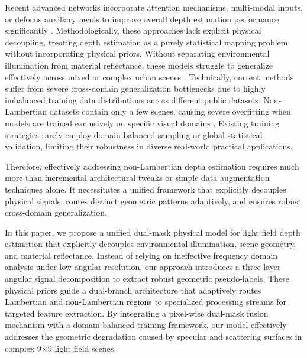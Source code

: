 \documentclass[lettersize,journal]{IEEEtran}
\begin{document}
Recent advanced networks incorporate attention mechanisms, multi-modal inputs, or defocus auxiliary heads to improve overall depth estimation performance significantly \cite{attention_lf, defocus_lf}. Methodologically, these approaches lack explicit physical decoupling, treating depth estimation as a purely statistical mapping problem without incorporating physical priors. Without separating environmental illumination from material reflectance, these models struggle to generalize effectively across mixed or complex urban scenes \cite{mixed_scenes, generalization}. Technically, current methods suffer from severe cross-domain generalization bottlenecks due to highly imbalanced training data distributions across different public datasets. Non-Lambertian datasets contain only a few scenes, causing severe overfitting when models are trained exclusively on specific visual domains \cite{data_imbalance, overfitting}. Existing training strategies rarely employ domain-balanced sampling or global statistical validation, limiting their robustness in diverse real-world practical applications.

Therefore, effectively addressing non-Lambertian depth estimation requires much more than incremental architectural tweaks or simple data augmentation techniques alone. It necessitates a unified framework that explicitly decouples physical signals, routes distinct geometric patterns adaptively, and ensures robust cross-domain generalization.

In this paper, we propose a unified dual-mask physical model for light field depth estimation that explicitly decouples environmental illumination, scene geometry, and material reflectance. Instead of relying on ineffective frequency domain analysis under low angular resolution, our approach introduces a three-layer angular signal decomposition to extract robust geometric pseudo-labels. These physical priors guide a dual-branch architecture that adaptively routes Lambertian and non-Lambertian regions to specialized processing streams for targeted feature extraction. By integrating a pixel-wise dual-mask fusion mechanism with a domain-balanced training framework, our model effectively addresses the geometric degradation caused by specular and scattering surfaces in complex 9$\times$9 light field scenes.
\end{document}
